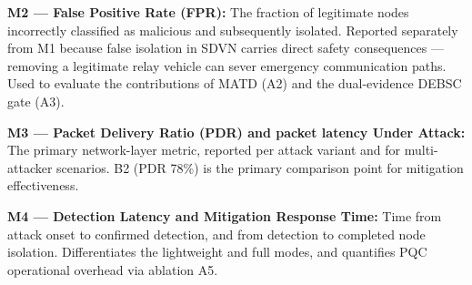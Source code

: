 \documentclass[12pt, a4paper]{report}
\begin{document}
\textbf{M2 — False Positive Rate (FPR):} The fraction of legitimate nodes
incorrectly classified as malicious and subsequently isolated. Reported
separately from M1 because false isolation in SDVN carries direct safety
consequences — removing a legitimate relay vehicle can sever emergency
communication paths. Used to evaluate the contributions of MATD (A2)
and the dual-evidence DEBSC gate (A3).

\textbf{M3 — Packet Delivery Ratio (PDR) and packet latency Under Attack:} The primary
network-layer metric, reported per attack variant and for multi-attacker
scenarios. B2 (PDR 78\%) is the primary comparison point for mitigation
effectiveness.

\textbf{M4 — Detection Latency and Mitigation Response Time:}
Time from attack onset to confirmed detection, and from detection to
completed node isolation. Differentiates the lightweight and full modes,
and quantifies PQC operational overhead via ablation A5.
\end{document}
